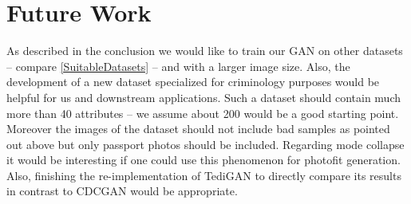 \documentclass[12pt, a4paper]{article}
\begin{document}
\section{Future Work}
As described in the conclusion we would like to train our GAN on other datasets -- compare \ref{SuitableDatasets} -- and with a larger image size.
Also, the development of a new dataset specialized for criminology purposes would be helpful for us and downstream applications.
Such a dataset should contain much more than 40 attributes -- we assume about 200 would be a good starting point.
Moreover the images of the dataset should not include bad samples as pointed out above but only passport photos should be included.
Regarding mode collapse it would be interesting if one could use this phenomenon for photofit generation.
Also, finishing the re-implementation of TediGAN to directly compare its results in contrast to CDCGAN would be appropriate.
\end{document}
